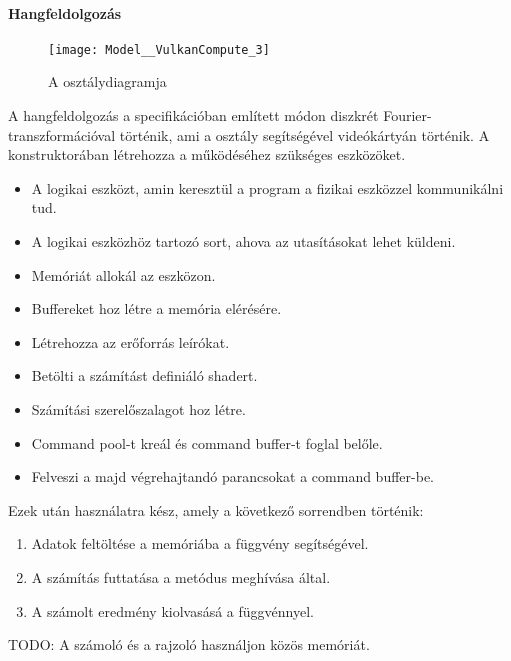 \paragraph{Hangfeldolgoz\'as}
\begin{figure}[h]
	\texttt{[image: Model\_\_VulkanCompute\_3]}
	\centering
	\caption{A  oszt\'alydiagramja}
\end{figure}
A hangfeldolgoz\'as a specifik\'aci\'oban eml\'itett m\'odon diszkr\'et Fourier-transzform\'aci\'oval t\"ort\'enik, ami a  oszt\'aly seg\'its\'eg\'evel vide\'ok\'arty\'an t\"ort\'enik.
A konstruktor\'aban l\'etrehozza a m\H uk\"od\'es\'ehez sz\"uks\'eges eszk\"oz\"oket. 
\begin{itemize}
	\item A logikai eszk\"ozt, amin kereszt\"ul a program a fizikai eszk\"ozzel kommunik\'alni tud.
	\item A logikai eszk\"ozh\"oz tartoz\'o sort, ahova az utas\'it\'asokat lehet k\"uldeni.
	\item Mem\'ori\'at allok\'al az eszk\"ozon.
	\item Buffereket hoz l\'etre a mem\'oria el\'er\'es\'ere.
	\item L\'etrehozza az er\H oforr\'as le\'ir\'okat.
	\item Bet\"olti a sz\'am\'it\'ast defini\'al\'o shadert.
	\item Sz\'am\'it\'asi szerel\H oszalagot hoz l\'etre.
	\item Command pool-t kre\'al \'es command buffer-t foglal bel\H ole.
	\item Felveszi a majd v\'egrehajtand\'o parancsokat a command buffer-be.
\end{itemize}

Ezek ut\'an haszn\'alatra k\'esz, amely a k\"ovetkez\H o sorrendben t\"ort\'enik:
\begin{enumerate}
	\item Adatok felt\"olt\'ese a mem\'ori\'aba a  f\"uggv\'eny seg\'its\'eg\'evel.
	\item A sz\'am\'it\'as futtat\'asa a  met\'odus megh\'iv\'asa \'altal.
	\item A sz\'amolt eredm\'eny kiolvas\'as\'a a  f\"uggv\'ennyel.
\end{enumerate}
TODO: A sz\'amol\'o \'es a rajzol\'o haszn\'aljon k\"oz\"os mem\'ori\'at.

